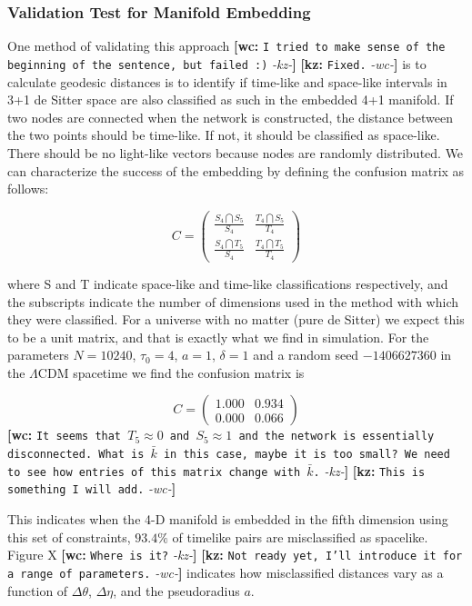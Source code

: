 \documentclass[preprint,notitlepage,amsmath,amssymb,floatfix]{revtex4-1}
\newcommand{\XXX}[3]{{\bf [#1: } {\tt #3} {\it -#2-}{\bf ]}}
\begin{document}
\subsubsection{Validation Test for Manifold Embedding}
One method of validating this approach \XXX{wc}{kz}{I tried to make sense of the beginning of the sentence, but failed :)} \XXX{kz}{wc}{Fixed.} is to calculate geodesic distances is to identify if time-like and space-like intervals in 3+1 de Sitter space are also classified as such in the embedded 4+1 manifold.  
If two nodes are connected when the network is constructed, the distance between the two points should be time-like.  
If not, it should be classified as space-like.  
There should be no light-like vectors because nodes are randomly distributed.
We can characterize the success of the embedding by defining the confusion matrix as follows:

\begin{equation}
C = \left( \begin{array}{cc}
\frac{S_4 \bigcap S_5}{S_4} & \frac{T_4 \bigcap S_5}{T_4} \\
\frac{S_4 \bigcap T_5}{S_4} & \frac{T_4 \bigcap T_5}{T_4} \end{array} \right)
\end{equation}

where S and T indicate space-like and time-like classifications respectively, and the subscripts indicate the number of dimensions used in the method with which they were classified.
For a universe with no matter (pure de Sitter) we expect this to be a unit matrix, and that is exactly what we find in simulation.
For the parameters $N = 10240$, $\tau_0 = 4$, $a = 1$, $\delta = 1$ and a random seed $-1406627360$ in the $\Lambda$CDM spacetime  we find the confusion matrix is

\begin{equation}
C = \left( \begin{array}{cc}
1.000 & 0.934 \\
0.000 & 0.066 \end{array} \right)
\end{equation}
\XXX{wc}{kz}{It seems that $T_5\approx0$ and $S_5\approx1$ and the network is essentially disconnected. What is $\bar{k}$ in this case, maybe it is too small? We need to see how entries of this matrix change with $\bar{k}$.} \XXX{kz}{wc}{This is something I will add.}

This indicates when the 4-D manifold is embedded in the fifth dimension using this set of constraints, $93.4\%$ of timelike pairs are misclassified as spacelike.
Figure X \XXX{wc}{kz}{Where is it?} \XXX{kz}{wc}{Not ready yet, I'll introduce it for a range of parameters.} indicates how misclassified distances vary as a function of $\Delta\theta$, $\Delta\eta$, and the pseudoradius $a$.
\end{document}
